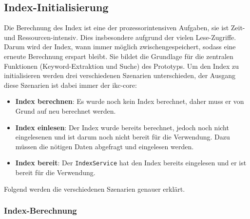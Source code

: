
    
\subsection{Index-Initialisierung}


Die Berechnung des Index ist eine der prozessorintensiven Aufgaben, sie ist Zeit- und Ressourcen-intensiv. Dies insbesondere aufgrund der vielen Lese-Zugriffe. Darum wird der Index, wann immer möglich zwischengespeichert, sodass eine erneute Berechnung erspart bleibt. Sie bildet die Grundlage für die zentralen Funktionen (\gls{Keyword}-Ex\-trak\-tion und Suche) des Prototyps. Um den Index zu initialisieren werden drei verschiedenen Szenarien unterschieden, der Ausgang diese Szenarien ist dabei immer der \gls{ikc-core}:
\begin{itemize}
    \item \textbf{Index berechnen}: Es wurde noch kein Index berechnet, daher muss er von Grund auf neu berechnet werden.
    \item \textbf{Index einlesen}: Der Index wurde bereits berechnet, jedoch noch nicht eingelesenen und ist darum noch nicht bereit für die Verwendung. Dazu müssen die nötigen Daten abgefragt und eingelesen werden.
    \item \textbf{Index bereit}: Der \texttt{IndexService} hat den Index bereits eingelesen und er ist bereit für die Verwendung.
\end{itemize}

Folgend werden die verschiedenen Szenarien genauer erklärt.


\subsubsection{Index-Berechnung}


